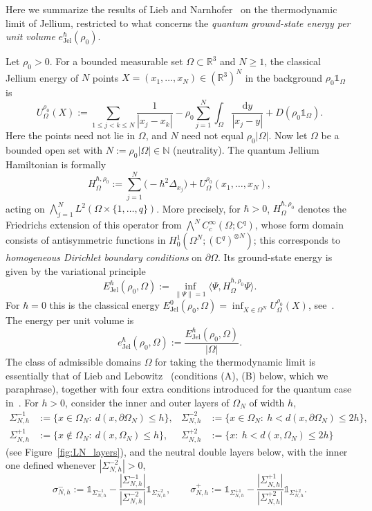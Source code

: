 \documentclass[final,reqno]{amsart}
\theoremstyle{remark}
\theoremstyle{definition}
\renewcommand{\le}{\leqslant}
\renewcommand{\ge}{\geqslant}
\newcommand{\RR}{\mathbb{R}}
\newcommand{\CC}{\mathbb{C}}
\newcommand{\NN}{\mathbb{N}}
\newcommand{\iden}{\mathbb{1}}
\newcommand{\Jel}{\mathrm{Jel}}
\begin{document}
Here we summarize the results of Lieb and Narnhofer~\cite{lieb1975thermodynamic} on the thermodynamic limit of Jellium, restricted to what concerns the \emph{quantum ground-state energy per unit volume} $e^\hbar_\Jel(\rho_0)$.

Let $\rho_0>0$. For a bounded measurable set $\Omega\subset\RR^3$ and $N\ge1$, the classical Jellium energy of $N$ points $X=(x_1,\dots,x_N)\in(\RR^3)^N$ in the background $\rho_0\iden_\Omega$ is
\begin{equation}\label{eq:LN_U}
U^{\rho_0}_\Omega(X):=\sum_{1\le j<k\le N}\frac{1}{|x_j-x_k|}-\rho_0\sum_{j=1}^N\int_\Omega\frac{\mathrm{d}y}{|x_j-y|}+D(\rho_0\iden_\Omega).
\end{equation}
Here the points need not lie in $\Omega$, and $N$ need not equal $\rho_0|\Omega|$. Now let $\Omega$ be a bounded open set with $N:=\rho_0|\Omega|\in\NN$ (neutrality). The quantum Jellium Hamiltonian is formally
\begin{equation}\label{eq:LN_H}
H^{\hbar,\rho_0}_\Omega:=\sum_{j=1}^N\big(-\hbar^2\Delta_{x_j}\big)+U^{\rho_0}_\Omega(x_1,\dots,x_N),
\end{equation}
acting on $\bigwedge_{j=1}^NL^2(\Omega\times\{1,\dots,q\})$. More precisely, for $\hbar>0$, $H^{\hbar,\rho_0}_\Omega$ denotes the Friedrichs extension of this operator from $\bigwedge^NC_c^\infty(\Omega;\CC^q)$, whose form domain consists of antisymmetric functions in $H^1_0(\Omega^N;(\CC^q)^{\otimes N})$; this corresponds to \emph{homogeneous Dirichlet boundary conditions} on $\partial\Omega$. Its ground-state energy is
given by the variational principle
\[
\boxed{E^\hbar_\Jel(\rho_0,\Omega):=\inf_{\|\Psi\|=1}\big\langle\Psi,H^{\hbar,\rho_0}_\Omega\Psi\big\rangle.}
\]
For $\hbar=0$ this is the classical energy $E^0_\Jel(\rho_0,\Omega)=\inf_{X\in\Omega^N}U^{\rho_0}_\Omega(X)$, see~\cite{lieb1975thermodynamic,sari1976nu,lewin2018statistical,lewin2022coulomb}. The energy per unit volume is
\[
e^\hbar_\Jel(\rho_0,\Omega):=\frac{E^\hbar_\Jel(\rho_0,\Omega)}{|\Omega|}.
\]
The class of admissible domains $\Omega$ for taking the thermodynamic limit is essentially that of Lieb and Lebowitz~\cite[Sec.~V]{lieb1972constitution} (conditions (A), (B) below, which we paraphrase), together with four extra conditions introduced for the quantum case in~\cite[Sec.~5.2]{lieb1975thermodynamic}. For $h>0$, consider the inner and outer layers of $\Omega_N$ of width $h$,
\begin{align*}
\Sigma^{-1}_{N,h}&:=\{x\in\Omega_N:\ d(x,\partial\Omega_N)\le h\}, & \Sigma^{-2}_{N,h}&:=\{x\in\Omega_N:\ h<d(x,\partial\Omega_N)\le2h\},\\
\Sigma^{+1}_{N,h}&:=\{x\notin\Omega_N:\ d(x,\Omega_N)\le h\}, & \Sigma^{+2}_{N,h}&:=\{x:\ h<d(x,\Omega_N)\le2h\}
\end{align*}
(see Figure~\ref{fig:LN_layers}), and the neutral double layers below, with the inner one defined whenever $|\Sigma^{-2}_{N,h}|>0$,
\[
\sigma^-_{N,h}:=\iden_{\Sigma^{-1}_{N,h}}-\frac{|\Sigma^{-1}_{N,h}|}{|\Sigma^{-2}_{N,h}|}\iden_{\Sigma^{-2}_{N,h}},\qquad
\sigma^+_{N,h}:=\iden_{\Sigma^{+1}_{N,h}}-\frac{|\Sigma^{+1}_{N,h}|}{|\Sigma^{+2}_{N,h}|}\iden_{\Sigma^{+2}_{N,h}}.
\]
\end{document}
